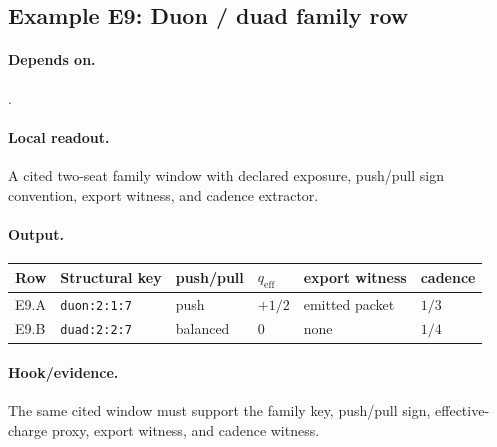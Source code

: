 \subsection{Example E9: Duon / duad family row}\label{ex:e9}
\paragraph{Depends on.} .
\paragraph{Local readout.} A cited two-seat family window with declared exposure, push/pull sign convention, export witness, and cadence extractor.
\paragraph{Output.}
{\footnotesize
\begin{center}
\begin{tabular}{@{}llllll@{}}
\toprule
Row & Structural key & push/pull & $q_{\mathrm{eff}}$ & export witness & cadence \\
\midrule
E9.A & \texttt{duon:2:1:7} & push & $+1/2$ & emitted packet & $1/3$ \\
E9.B & \texttt{duad:2:2:7} & balanced & $0$ & none & $1/4$ \\
\bottomrule
\end{tabular}
\end{center}}
\paragraph{Hook/evidence.} The same cited window must support the family key, push/pull sign, effective-charge proxy, export witness, and cadence witness.
